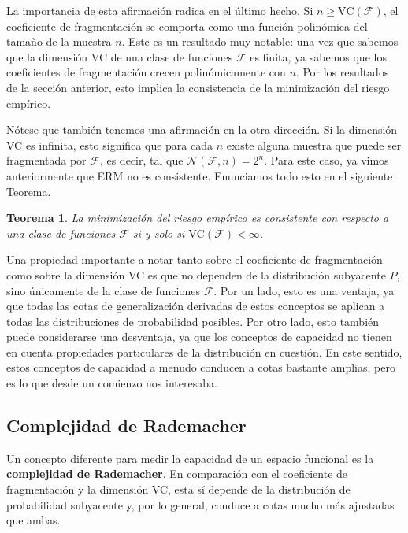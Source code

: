 \documentclass{report}
\newtheorem{thm}{Teorema}[subsection]
\begin{document}
La importancia de esta afirmación radica en el último hecho. Si \( n \geq \text{VC}(\mathcal{F}) \), 
el coeficiente de fragmentación se comporta como una función polinómica del tamaño de la muestra \( n \). 
Este es un resultado muy notable: una vez que sabemos que la dimensión VC de una clase de funciones 
\(\mathcal{F}\) es finita, ya sabemos que los coeficientes de fragmentación crecen polinómicamente con \( n \). 
Por los resultados de la sección anterior, esto implica la consistencia de la minimización del riesgo empírico.\newline

Nótese que también tenemos una afirmación en la otra dirección. Si la dimensión VC es infinita, esto significa 
que para cada \( n \) existe alguna muestra que puede ser fragmentada por \(\mathcal{F}\), es decir, tal que
\(\mathcal{N}(\mathcal{F}, n) = 2^n. \) Para este caso, ya vimos anteriormente que ERM no es consistente.
Enunciamos todo esto en el siguiente Teorema.\newline

\begin{thm}
    La minimización del riesgo empírico es consistente con respecto a una clase de funciones \(\mathcal{F}\) si y solo si
    \(\text{VC}(\mathcal{F}) < \infty\).\newline 
\end{thm}

Una propiedad importante a notar tanto sobre el coeficiente de fragmentación como sobre la 
dimensión VC es que no dependen de la distribución subyacente \( P \), sino únicamente de la 
clase de funciones \(\mathcal{F}\). Por un lado, esto es una ventaja, ya que todas las cotas de 
generalización derivadas de estos conceptos se aplican a todas las distribuciones de probabilidad 
posibles. Por otro lado, esto también puede considerarse una desventaja, ya que los conceptos de 
capacidad no tienen en cuenta propiedades particulares de la distribución en cuestión. En este 
sentido, estos conceptos de capacidad a menudo conducen a cotas bastante amplias, pero es lo que desde
un comienzo nos interesaba.\newline

\subsection{Complejidad de Rademacher}
Un concepto diferente para medir la capacidad de un espacio funcional es la \textbf{complejidad de Rademacher}. 
En comparación con el coeficiente de fragmentación y la dimensión VC, esta sí depende de la distribución de 
probabilidad subyacente y, por lo general, conduce a cotas mucho más ajustadas que ambas.\newline
\end{document}
